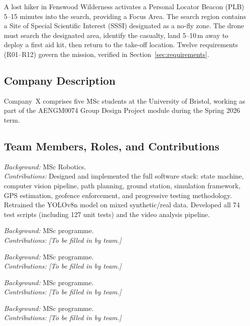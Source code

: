 A lost hiker in Fenswood Wilderness activates a Personal Locator Beacon (PLB) 5--15 minutes into the search, providing a Focus Area. The search region contains a Site of Special Scientific Interest (SSSI) designated as a no-fly zone. The drone must search the designated area, identify the casualty, land 5--10\,m away to deploy a first aid kit, then return to the take-off location. Twelve requirements (R01--R12) govern the mission, verified in Section~\ref{sec:requirements}.

\subsection{Company Description}\label{sec:company}

Company~X comprises five MSc students at the University of Bristol, working as part of the AENGM0074 Group Design Project module during the Spring 2026 term.

\subsection{Team Members, Roles, and Contributions}\label{sec:team}


\begin{description}[style=nextline, leftmargin=0pt, labelwidth=0pt]

\item[\textbf{Member 1} --- Software Lead / Systems Integration]
\textit{Background:} MSc Robotics. \\
\textit{Contributions:} Designed and implemented the full software stack: state machine, computer vision pipeline, path planning, ground station, simulation framework, GPS estimation, geofence enforcement, and progressive testing methodology. Retrained the YOLOv8n model on mixed synthetic/real data. Developed all 74 test scripts (including 127 unit tests) and the video analysis pipeline.

\item[\textbf{Member 2} --- Role]
\textit{Background:} MSc programme. \\
\textit{Contributions:} \textit{[To be filled in by team.]}

\item[\textbf{Member 3} --- Role]
\textit{Background:} MSc programme. \\
\textit{Contributions:} \textit{[To be filled in by team.]}

\item[\textbf{Member 4} --- Role]
\textit{Background:} MSc programme. \\
\textit{Contributions:} \textit{[To be filled in by team.]}

\item[\textbf{Member 5} --- Role]
\textit{Background:} MSc programme. \\
\textit{Contributions:} \textit{[To be filled in by team.]}

\end{description}

